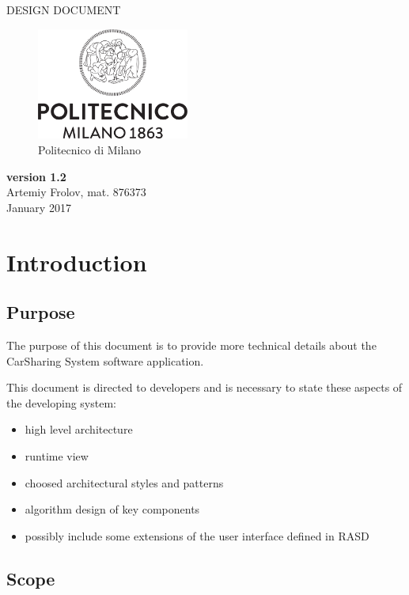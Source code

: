 \documentclass[12pt, letterpaper]{article}
\begin{document}
\begin{titlepage}
\centering
{\Large DESIGN DOCUMENT} \\
\begin{figure}[H]
\centering
\includegraphics[width=5cm]{Logo_Politecnico_Milano.png}
\caption{Politecnico di Milano}
\label{fig:PoliMi}
\end{figure}
\textbf{version 1.2} \\
\vspace{0.5cm}
Artemiy Frolov, mat. 876373 \\
\vspace{0.5cm}
January 2017
\end{titlepage}


\tableofcontents{}

\newpage

\section{Introduction}
\subsection{Purpose}

The purpose of this document is to provide more technical details about the CarSharing System software application.

This document is directed to developers and is necessary to state these aspects of the developing system: 
\begin{itemize}
	\item high level architecture 
	\item runtime view 
	\item choosed architectural styles and patterns
	\item algorithm design of key components 
	\item possibly include some extensions of the user interface defined in RASD 
\end{itemize}

\subsection{Scope}
\end{document}
